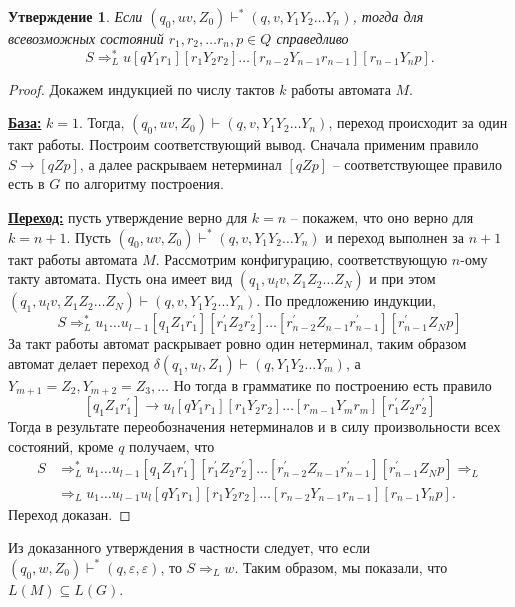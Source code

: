 \documentclass[12pt]{article}
\theoremstyle{definiton}
\newtheorem{Claim}{Утверждение}
\theoremstyle{definition}
\theoremstyle{definition}
\let\eps\varepsilon
\let\yield\Rightarrow
\def\yields{\Rightarrow^*}
\begin{document}
\begin{Claim}\label{conf_to_cfl}
	Если $(q_0, uv, Z_0) \vdash^* (q,v, Y_1Y_2\ldots Y_n)$, тогда для всевозможных состояний $r_1,r_2,\ldots r_n, p \in Q$ справедливо \[S \yield^*_L u[qY_1r_1][r_1Y_2r_2]\ldots[r_{n-2}Y_{n-1}r_{n-1}][r_{n-1}Y_np].  \]
\end{Claim}
\begin{proof}
	Докажем индукцией по числу тактов $k$ работы автомата $M$. 
	
\noindent\textbf{\underline{База:}} $k = 1$. Тогда, $(q_0, uv, Z_0) \vdash (q,v, Y_1Y_2\ldots Y_n)$, переход происходит за один такт работы. Построим соответствующий вывод. Сначала применим правило $S \to [qZp]$, а далее раскрываем нетерминал $[qZp]$ -- соответствующее  правило есть в $G$ по алгоритму построения.
\smallskip

\noindent\textbf{\underline{Переход:}} пусть утверждение верно для $k = n$ -- покажем, что оно верно для $k = n+1$. Пусть $(q_0, uv, Z_0) \vdash^* (q,v, Y_1Y_2\ldots Y_n)$ и переход выполнен за $n+1$ такт работы автомата $M$. Рассмотрим конфигурацию, соответствующую $n$-ому такту автомата. Пусть она имеет вид $(q_1,u_lv, Z_1Z_2\ldots Z_N)$ и при этом $(q_1,u_lv, Z_1Z_2\ldots Z_N) \vdash (q,v, Y_1Y_2\ldots Y_n)$. По предложению индукции,
 \[S \yields_L u_1\ldots u_{l-1}[q_1Z_1r^\prime_1][r^\prime_1Z_2r^\prime_2]\ldots[r^\prime_{n-2}Z_{n-1}r^\prime_{n-1}][r^\prime_{n-1}Z_Np]\]
За такт работы автомат раскрывает ровно один нетерминал, таким образом автомат делает переход $\delta(q_1,u_l,Z_1) \vdash (q,Y_1Y_2\ldots Y_m)$,  а $Y_{m+1} = Z_2, Y_{m+2} = Z_3, \ldots$ Но тогда в грамматике по построению есть правило \[[q_1Z_1r^\prime_1] \to u_l[qY_1r_1][r_1Y_2r_2]\ldots[r_{m-1}Y_mr_m][r^\prime_1Z_2r^\prime_2]\]
Тогда в результате переобозначения нетерминалов и в силу произвольности всех состояний, кроме $q$ получаем, что
\begin{align*}
 S &\yields_L  u_1\ldots u_{l-1}[q_1Z_1r^\prime_1][r^\prime_1Z_2r^\prime_2]\ldots[r^\prime_{n-2}Z_{n-1}r^\prime_{n-1}][r^\prime_{n-1}Z_Np] \yield_L \\ &\yield_L u_1\ldots u_{l-1}u_l[qY_1r_1][r_1Y_2r_2]\ldots[r_{n-2}Y_{n-1}r_{n-1}][r_{n-1}Y_np].
\end{align*}
Переход доказан.
\end{proof}

Из доказанного утверждения в частности следует, что если $(q_0,w,Z_0) \vdash^* (q,\eps,\eps)$, то $S \yield_L w$. Таким образом, мы показали, что $L(M) \subseteq L(G)$.
\end{document}
